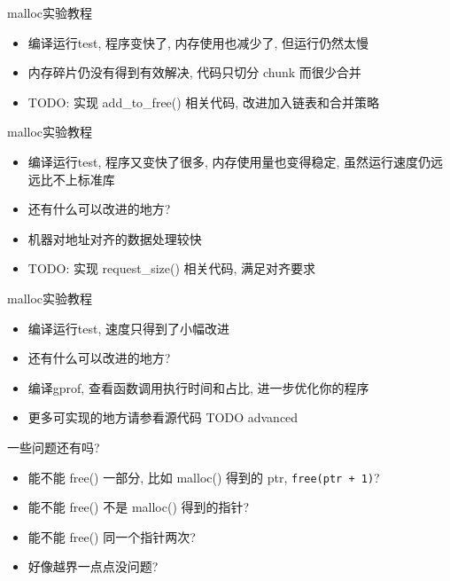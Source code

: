 \begin{frame}[fragile]{malloc实验教程}
    \begin{itemize}[<+- | alert@+>]
        \item 编译运行test, 程序变快了, 内存使用也减少了, 但运行仍然太慢
        \item 内存碎片仍没有得到有效解决, 代码只切分 chunk 而很少合并
        \item TODO: 实现 add\_to\_free() 相关代码, 改进加入链表和合并策略
    \end{itemize}
\end{frame}

\begin{frame}[fragile]{malloc实验教程}
    \begin{itemize}[<+- | alert@+>]
        \item 编译运行test, 程序又变快了很多, 内存使用量也变得稳定, 虽然运行速度仍远远比不上标准库
        \item 还有什么可以改进的地方?
        \item 机器对地址对齐的数据处理较快
        \item TODO: 实现 request\_size() 相关代码, 满足对齐要求
    \end{itemize}
\end{frame}

\begin{frame}[fragile]{malloc实验教程}
    \begin{itemize}[<+- | alert@+>]
        \item 编译运行test, 速度只得到了小幅改进
        \item 还有什么可以改进的地方?
        \item 编译gprof, 查看函数调用执行时间和占比, 进一步优化你的程序
        \item 更多可实现的地方请参看源代码 TODO advanced
    \end{itemize}
\end{frame}

\begin{frame}[fragile]{一些问题还有吗?}
    \begin{itemize}[<+- | alert@+>]
        \item 能不能 free() 一部分, 比如 malloc() 得到的 ptr, \texttt{free(ptr + 1)}?
        \item 能不能 free() 不是 malloc() 得到的指针?
        \item 能不能 free() 同一个指针两次?
        \item 好像越界一点点没问题?
    \end{itemize}
\end{frame}

